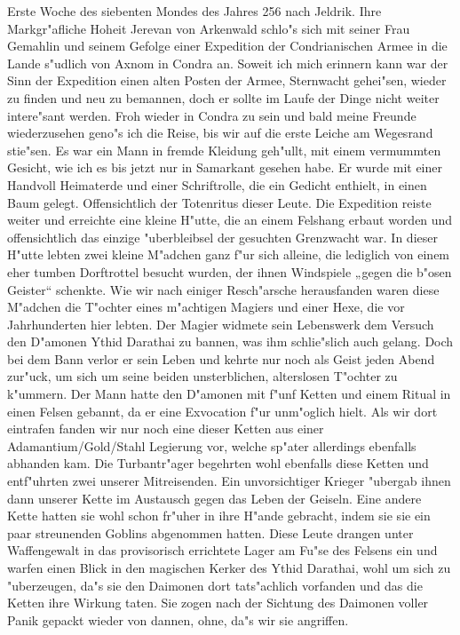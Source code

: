 \documentclass[a5paper,8pt]{book}
\begin{document}
Erste Woche des siebenten Mondes des Jahres 256 nach Jeldrik. Ihre Markgr"afliche Hoheit Jerevan von Arkenwald schlo"s sich mit seiner Frau Gemahlin und seinem Gefolge 
einer Expedition der Condrianischen Armee in die Lande s"udlich von Axnom in Condra an. Soweit ich mich erinnern kann war der Sinn der Expedition einen alten Posten der Armee, 
Sternwacht gehei"sen, wieder zu finden und neu zu bemannen, doch er sollte im Laufe der Dinge nicht weiter intere"sant werden.
Froh wieder in Condra zu sein und bald meine Freunde wiederzusehen geno"s ich die Reise, bis wir auf die erste Leiche am Wegesrand stie"sen. Es war ein Mann in fremde Kleidung 
geh"ullt, mit einem vermummten Gesicht, wie ich es bis jetzt nur in Samarkant gesehen habe. Er wurde mit einer Handvoll Heimaterde und einer Schriftrolle, die ein Gedicht enthielt, in einen Baum gelegt. Offensichtlich der Totenritus dieser Leute. Die Expedition reiste weiter und erreichte eine kleine H"utte, die an einem Felshang erbaut worden und offensichtlich das einzige "uberbleibsel der gesuchten Grenzwacht war. In dieser H"utte lebten zwei kleine M"adchen ganz f"ur sich alleine, die lediglich von einem eher tumben Dorftrottel besucht wurden, der ihnen Windspiele „gegen die b"osen Geister“ schenkte.
Wie wir nach einiger Resch"arsche herausfanden waren diese M"adchen die T"ochter eines m"achtigen Magiers und einer Hexe, die vor Jahrhunderten hier lebten. Der Magier widmete sein Lebenswerk dem Versuch den D"amonen Ythid Darathai zu bannen, was ihm schlie"slich auch gelang. Doch bei dem Bann verlor er sein Leben und kehrte nur noch als Geist jeden Abend zur"uck, um sich um seine beiden unsterblichen, alterslosen T"ochter zu k"ummern.
Der Mann hatte den D"amonen mit f"unf Ketten und einem Ritual in einen Felsen gebannt, da er eine Exvocation f"ur unm"oglich hielt. Als wir dort eintrafen fanden wir nur noch eine dieser Ketten aus einer Adamantium/Gold/Stahl Legierung vor, welche sp"ater allerdings ebenfalls abhanden kam. Die Turbantr"ager begehrten wohl ebenfalls diese Ketten und entf"uhrten zwei unserer Mitreisenden. Ein unvorsichtiger Krieger "ubergab ihnen dann unserer Kette im Austausch gegen das Leben der Geiseln. Eine andere Kette hatten sie wohl schon fr"uher in ihre H"ande gebracht, indem sie sie ein paar streunenden Goblins abgenommen hatten.
Diese Leute drangen unter Waffengewalt in das provisorisch errichtete Lager am Fu"se des Felsens ein und warfen einen Blick in den magischen Kerker des Ythid Darathai, wohl um sich zu "uberzeugen, da"s sie den Daimonen dort tats"achlich vorfanden und das die Ketten ihre Wirkung taten. Sie zogen nach der Sichtung des Daimonen voller Panik gepackt wieder von dannen, ohne, da"s wir sie angriffen.
\end{document}
